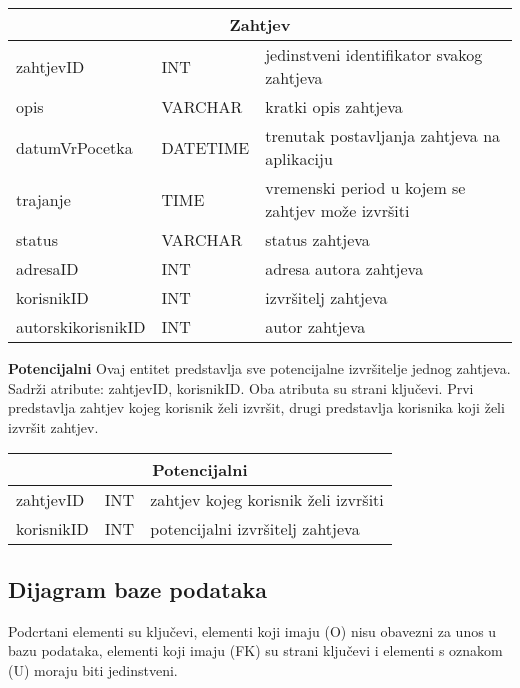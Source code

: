 			\begin{tabularx} {\textwidth} {|p{3.5cm}|p{2cm}|X|}
				
				\hline
				\multicolumn{3}{|c|}{\textbf{Zahtjev}} \\
				\hline
				
				\cellcolor{LightGreen}zahtjevID & INT	& jedinstveni identifikator svakog zahtjeva	\\ \hline
				opis	& VARCHAR &  kratki opis zahtjeva 	\\ \hline 
				datumVrPocetka & DATETIME &  trenutak postavljanja zahtjeva na aplikaciju \\ \hline 
				trajanje & TIME	&  vremenski period u kojem se zahtjev može izvršiti		\\ \hline 
				status & VARCHAR & status zahtjeva  \\ \hline
				\cellcolor{LightBlue} adresaID	& INT &  adresa autora zahtjeva 	\\ \hline 
				\cellcolor{LightBlue} korisnikID	& INT &  izvršitelj zahtjeva 	\\ \hline
				\cellcolor{LightBlue} autorskikorisnikID	& INT &   autor zahtjeva	\\ \hline
				
				
			\end{tabularx}
			
			\bigskip
			\bigskip
			\textbf{Potencijalni} Ovaj entitet predstavlja sve potencijalne izvršitelje jednog zahtjeva. Sadrži atribute: zahtjevID, korisnikID. Oba atributa su strani ključevi. Prvi predstavlja zahtjev kojeg korisnik želi izvršit, drugi predstavlja korisnika koji želi izvršit zahtjev.
			\bigskip
			
			\begin{tabularx}{\textwidth} {|p{2cm}|p{2cm}|X|}
				\hline
				\multicolumn{3}{|c|}{\textbf{Potencijalni}} \\
				\hline
				\cellcolor{LightGreen} zahtjevID & INT & zahtjev kojeg korisnik želi izvršiti \\
				\hline
				\cellcolor{LightGreen} korisnikID & INT & potencijalni izvršitelj zahtjeva \\
				\hline
			\end{tabularx}
			
			
			
			\newpage
			\subsection{Dijagram baze podataka}
			Podcrtani elementi su ključevi, elementi koji imaju (O) nisu obavezni za unos u bazu podataka, elementi koji imaju (FK) su strani ključevi i elementi s oznakom (U) moraju biti jedinstveni.
			
